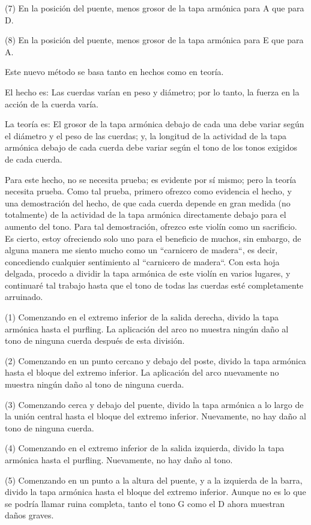 \documentclass[12pt]{book}
\begin{document}
(7) En la posición del puente, menos grosor de la tapa armónica para A que para D.

(8) En la posición del puente, menos grosor de la tapa armónica para E que para A.

Este nuevo método se basa tanto en hechos como en teoría.

El hecho es: Las cuerdas varían en peso y diámetro; por lo tanto, la fuerza en la acción de la cuerda varía.

La teoría es: El grosor de la tapa armónica debajo de cada una debe variar según el diámetro y el peso de las cuerdas; y, la longitud de la actividad de la tapa armónica debajo de cada cuerda debe variar según el tono de los tonos exigidos de cada cuerda.

Para este hecho, no se necesita prueba; es evidente por sí mismo; pero la teoría necesita prueba. Como tal prueba, primero ofrezco como evidencia el hecho, y una demostración del hecho, de que cada cuerda depende en gran medida (no totalmente) de la actividad de la tapa armónica directamente debajo para el aumento del tono. Para tal demostración, ofrezco este violín como un sacrificio. Es cierto, estoy ofreciendo solo uno para el beneficio de muchos, sin embargo, de alguna manera me siento mucho como un ``carnicero de madera``, es decir, concediendo cualquier sentimiento al ``carnicero de madera``. Con esta hoja delgada, procedo a dividir la tapa armónica de este violín en varios lugares, y continuaré tal trabajo hasta que el tono de todas las cuerdas esté completamente arruinado.

(1) Comenzando en el extremo inferior de la salida derecha, divido la tapa armónica hasta el purfling. La aplicación del arco no muestra ningún daño al tono de ninguna cuerda después de esta división.

(2) Comenzando en un punto cercano y debajo del poste, divido la tapa armónica hasta el bloque del extremo inferior. La aplicación del arco nuevamente no muestra ningún daño al tono de ninguna cuerda.

(3) Comenzando cerca y debajo del puente, divido la tapa armónica a lo largo de la unión central hasta el bloque del extremo inferior. Nuevamente, no hay daño al tono de ninguna cuerda.

(4) Comenzando en el extremo inferior de la salida izquierda, divido la tapa armónica hasta el purfling. Nuevamente, no hay daño al tono.

(5) Comenzando en un punto a la altura del puente, y a la izquierda de la barra, divido la tapa armónica hasta el bloque del extremo inferior. Aunque no es lo que se podría llamar ruina completa, tanto el tono G como el D ahora muestran daños graves.
\end{document}
